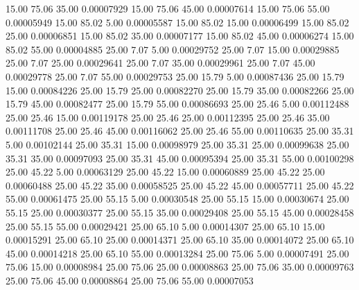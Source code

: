      15.00     75.06     35.00     0.00007929
     15.00     75.06     45.00     0.00007614
     15.00     75.06     55.00     0.00005949
     15.00     85.02      5.00     0.00005587
     15.00     85.02     15.00     0.00006499
     15.00     85.02     25.00     0.00006851
     15.00     85.02     35.00     0.00007177
     15.00     85.02     45.00     0.00006274
     15.00     85.02     55.00     0.00004885
     25.00      7.07      5.00     0.00029752
     25.00      7.07     15.00     0.00029885
     25.00      7.07     25.00     0.00029641
     25.00      7.07     35.00     0.00029961
     25.00      7.07     45.00     0.00029778
     25.00      7.07     55.00     0.00029753
     25.00     15.79      5.00     0.00087436
     25.00     15.79     15.00     0.00084226
     25.00     15.79     25.00     0.00082270
     25.00     15.79     35.00     0.00082266
     25.00     15.79     45.00     0.00082477
     25.00     15.79     55.00     0.00086693
     25.00     25.46      5.00     0.00112488
     25.00     25.46     15.00     0.00119178
     25.00     25.46     25.00     0.00112395
     25.00     25.46     35.00     0.00111708
     25.00     25.46     45.00     0.00116062
     25.00     25.46     55.00     0.00110635
     25.00     35.31      5.00     0.00102144
     25.00     35.31     15.00     0.00098979
     25.00     35.31     25.00     0.00099638
     25.00     35.31     35.00     0.00097093
     25.00     35.31     45.00     0.00095394
     25.00     35.31     55.00     0.00100298
     25.00     45.22      5.00     0.00063129
     25.00     45.22     15.00     0.00060889
     25.00     45.22     25.00     0.00060488
     25.00     45.22     35.00     0.00058525
     25.00     45.22     45.00     0.00057711
     25.00     45.22     55.00     0.00061475
     25.00     55.15      5.00     0.00030548
     25.00     55.15     15.00     0.00030674
     25.00     55.15     25.00     0.00030377
     25.00     55.15     35.00     0.00029408
     25.00     55.15     45.00     0.00028458
     25.00     55.15     55.00     0.00029421
     25.00     65.10      5.00     0.00014307
     25.00     65.10     15.00     0.00015291
     25.00     65.10     25.00     0.00014371
     25.00     65.10     35.00     0.00014072
     25.00     65.10     45.00     0.00014218
     25.00     65.10     55.00     0.00013284
     25.00     75.06      5.00     0.00007491
     25.00     75.06     15.00     0.00008984
     25.00     75.06     25.00     0.00008863
     25.00     75.06     35.00     0.00009763
     25.00     75.06     45.00     0.00008864
     25.00     75.06     55.00     0.00007053
